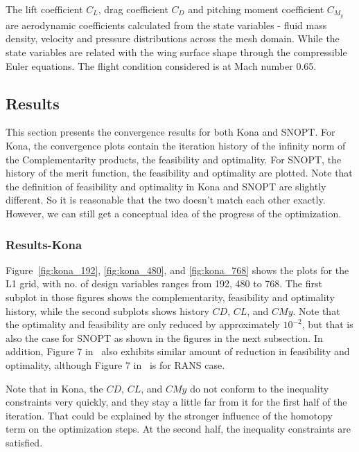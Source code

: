 The lift coefficient $C_L$, drag coefficient $C_D$ and pitching moment coefficient $C_{M_y}$ are aerodynamic coefficients calculated from the state variables - fluid mass density, velocity and pressure distributions across the mesh domain. While the state variables are related with the wing surface shape through the compressible Euler equations.  The flight condition considered is at Mach number 0.65. 


\subsection{Results}
This section presents the convergence results for both Kona and SNOPT. For Kona, the convergence plots contain 
the iteration history of the infinity norm of the Complementarity products, the feasibility and optimality. For SNOPT, 
the history of the merit function, the feasibility and optimality are plotted. Note that the definition of feasibility and optimality in Kona and SNOPT are slightly different. So it is reasonable that the two doesn't match each other exactly. 
However, we can still get a conceptual idea of the progress of the optimization.    
\subsubsection{Results-Kona}
Figure~\ref{fig:kona_192}, \ref{fig:kona_480}, and \ref{fig:kona_768} shows the plots for the L1 grid, with no. of 
design variables ranges from 192, 480 to 768. The first subplot in those figures shows the complementarity, feasibility and optimality history, while the second subplots shows history $CD$, $CL$, and $CMy$. Note that the 
optimality and feasibility are only reduced by approximately $10^{-2}$, but that is also the case for SNOPT as shown in the figures in the next subsection. In addition, Figure 7 in~\cite{2015lyu_crm} also exhibits similar amount of 
reduction in feasibility and optimality, although Figure 7 in~\cite{2015lyu_crm} is for RANS case. 

Note that in Kona, the $CD$, $CL$, and $CMy$ do not conform to the inequality constraints very quickly, and they 
stay a little far from it for the first half of the iteration. That could be explained by the stronger influence of the homotopy term on the optimization steps. At the second half, the inequality constraints are satisfied.   

